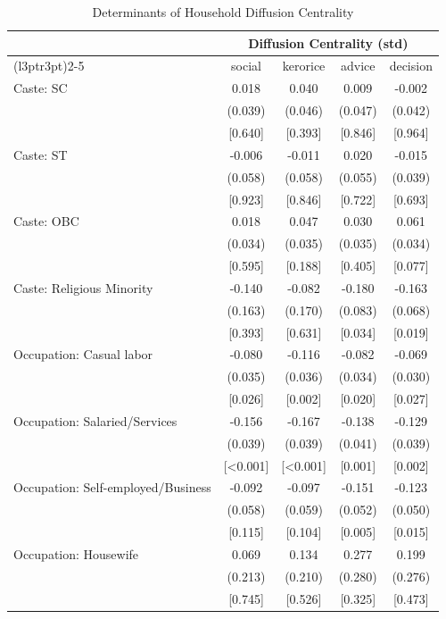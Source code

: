 \begin{table}
\centering
\caption{Determinants of Household Diffusion Centrality}
\centering
\begin{tabular}[t]{lcccc}
\toprule
\multicolumn{1}{c}{ } & \multicolumn{4}{c}{Diffusion Centrality (std)} \\
\cmidrule(l{3pt}r{3pt}){2-5}
  & social & kerorice & advice & decision\\
\midrule
Caste: SC & 0.018 & 0.040 & 0.009 & -0.002\\
 & (0.039) & (0.046) & (0.047) & (0.042)\\
 & {}[0.640] & {}[0.393] & {}[0.846] & {}[0.964]\\
Caste: ST & -0.006 & -0.011 & 0.020 & -0.015\\
 & (0.058) & (0.058) & (0.055) & (0.039)\\
 & {}[0.923] & {}[0.846] & {}[0.722] & {}[0.693]\\
Caste: OBC & 0.018 & 0.047 & 0.030 & 0.061\\
 & (0.034) & (0.035) & (0.035) & (0.034)\\
 & {}[0.595] & {}[0.188] & {}[0.405] & {}[0.077]\\
Caste: Religious Minority & -0.140 & -0.082 & -0.180 & -0.163\\
 & (0.163) & (0.170) & (0.083) & (0.068)\\
 & {}[0.393] & {}[0.631] & {}[0.034] & {}[0.019]\\
Occupation: Casual labor & -0.080 & -0.116 & -0.082 & -0.069\\
 & (0.035) & (0.036) & (0.034) & (0.030)\\
 & {}[0.026] & {}[0.002] & {}[0.020] & {}[0.027]\\
Occupation: Salaried/Services & -0.156 & -0.167 & -0.138 & -0.129\\
 & (0.039) & (0.039) & (0.041) & (0.039)\\
 & {}[<0.001] & {}[<0.001] & {}[0.001] & {}[0.002]\\
Occupation: Self-employed/Business & -0.092 & -0.097 & -0.151 & -0.123\\
 & (0.058) & (0.059) & (0.052) & (0.050)\\
 & {}[0.115] & {}[0.104] & {}[0.005] & {}[0.015]\\
Occupation: Housewife & 0.069 & 0.134 & 0.277 & 0.199\\
 & (0.213) & (0.210) & (0.280) & (0.276)\\
 & {}[0.745] & {}[0.526] & {}[0.325] & {}[0.473]\\

\end{tabular}
\end{table}
